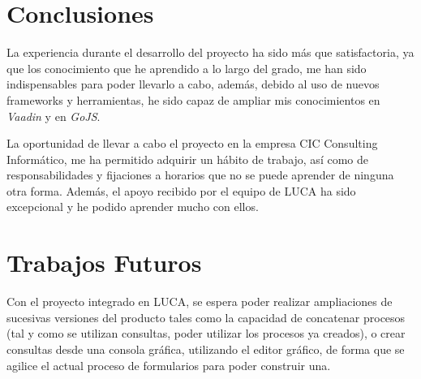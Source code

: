 \section{Conclusiones}

La experiencia durante el desarrollo del proyecto ha sido más que satisfactoria, ya que los conocimiento que he aprendido a lo largo del grado, me han sido indispensables para poder llevarlo a cabo, además, debido al uso de nuevos frameworks y herramientas, he sido capaz de ampliar mis conocimientos en \emph{Vaadin} y en \emph{GoJS}.

La oportunidad de llevar a cabo el proyecto en la empresa CIC Consulting Informático, me ha permitido adquirir un hábito de trabajo, así como de responsabilidades y fijaciones a horarios que no se puede aprender de ninguna otra forma. Además, el apoyo recibido por el equipo de LUCA ha sido excepcional y he podido aprender mucho con ellos.

\section{Trabajos Futuros}

Con el proyecto integrado en LUCA, se espera poder realizar ampliaciones de sucesivas versiones del producto tales como la capacidad de concatenar procesos (tal y como se utilizan consultas, poder utilizar los procesos ya creados), o crear consultas desde una consola gráfica, utilizando el editor gráfico, de forma que se agilice el actual proceso de formularios para poder construir una.


	